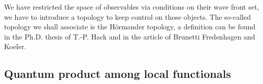 \documentclass[11pt]{book}
\theoremstyle{break}
\begin{document}
\bigskip


We have restricted the space of observables via conditions on their wave front set, we have to introduce a topology to keep control on those objects. The so-called topology we shall associate is the Hörmander topology, a definition can be found in the Ph.D. thesis of T.-P. Hack \cite[Chapter III]{HACK_2010} and in the article \cite{BFK_1996} of Brunetti Fredenhagen and Koeler.


\subsection{Quantum product among local functionals}
\end{document}
